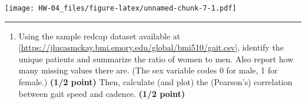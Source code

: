 \documentclass[
]{article}
\providecommand{\tightlist}{%
  \setlength{\itemsep}{0pt}\setlength{\parskip}{0pt}}
\begin{document}
\texttt{[image: HW-04\_files/figure-latex/unnamed-chunk-7-1.pdf]}

\begin{center}\rule{0.5\linewidth}{0.5pt}\end{center}

\begin{enumerate}
\def\labelenumi{\arabic{enumi}.}
\setcounter{enumi}{7}
\tightlist
\item
  Using the sample redcap dataset available at
  {[}\url{https://jlucasmckay.bmi.emory.edu/global/bmi510/gait.csv}{]},
  identify the unique patients and summarize the ratio of women to men.
  Also report how many missing values there are. (The sex variable codes
  0 for male, 1 for female.) \textbf{(1/2 point)} Then, calculate (and
  plot) the (Pearson's) correlation between gait speed and cadence.
  \textbf{(1/2 point)}
\end{enumerate}
\end{document}
